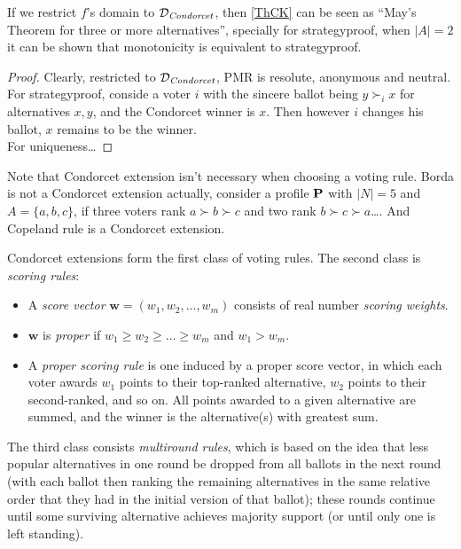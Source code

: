 If we restrict $f$'s domain to $\mathcal{D}_\textit{Condorcet}$, then \cref{ThCK} can be seen as “May's Theorem for three or more alternatives”, specially for strategyproof, when $|A| = 2$ it can be shown that monotonicity is equivalent to strategyproof.

\begin{proof}
    Clearly, restricted to $\mathcal{D}_\textit{Condorcet}$, PMR is resolute, anonymous and neutral. For strategyproof, conside a voter $i$ with the sincere ballot being $y \succ_i x$ for alternatives $x,y$, and the Condorcet winner is $x$. Then however $i$ changes his ballot, $x$ remains to be the winner.\\
    For uniqueness\dots
\end{proof}

Note that Condorcet extension isn't necessary when choosing a voting rule. Borda is not a Condorcet extension actually, consider a profile $\mathbf{P}$ with $|N| = 5$ and $A = \{a,b,c\}$, if three voters rank $a \succ b \succ c$ and two rank $b \succ c \succ a$\dots. And Copeland rule is a Condorcet extension.

Condorcet extensions form the first class of voting rules. The second class is \textit{scoring rules}:

\begin{definition}
    \begin{itemize}
        \item A \textit{score vector} $\mathbf{w} = (w_1,w_2,\dots,w_m)$ consists of real number \textit{scoring weights}. 
        \item $\mathbf{w}$ is \textit{proper} if $w_1 \geq w_2 \geq \dots \geq w_m$ and $w_1 > w_m$.
        \item A \textit{proper scoring rule} is one induced by a proper score vector, in which each voter awards $w_1$ points to their top-ranked alternative, $w_2$ points to their second-ranked, and so on. All points awarded to a given alternative are summed, and the winner is the alternative(s) with greatest sum.
    \end{itemize}
\end{definition}

\label{run-off}
The third class consists \textit{multiround rules}, which is based on the idea that less popular alternatives in one round be dropped from all ballots in the next round (with each ballot then ranking the remaining alternatives in the same relative order that they had in the initial version of that ballot); these rounds continue until some surviving alternative achieves majority support (or until only one is left standing).

